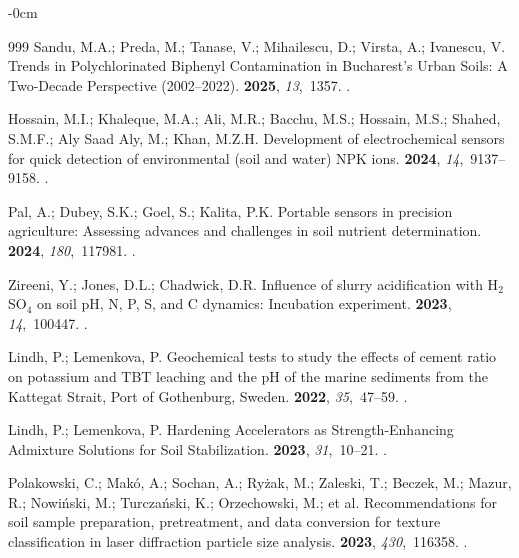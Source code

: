 \documentclass[environremediat,article,accept,pdftex,oneauthor]{Definitions/mdpi}
\begin{document}
\begin{adjustwidth}{-\extralength}{0cm}
\begin{thebibliography}{999}
Sandu, M.A.; Preda, M.; Tanase, V.;  Mihailescu, D.; Virsta, A.; Ivanescu, V.
\newblock Trends in Polychlorinated Biphenyl Contamination in Bucharest's Urban
  Soils: A Two-Decade Perspective (2002--2022).
 {\bf 2025}, {\em 13},~1357.
.

Hossain, M.I.; Khaleque, M.A.; Ali, M.R.; Bacchu, M.S.; Hossain, M.S.; Shahed, S.M.F.; Aly Saad Aly, M.; Khan, M.Z.H.
\newblock Development of electrochemical sensors for quick detection of
  environmental (soil and water) NPK ions.
 {\bf 2024}, {\em 14},~9137--9158.
.

Pal, A.; Dubey, S.K.; Goel, S.; Kalita, P.K.
\newblock Portable sensors in precision agriculture: Assessing advances and
  challenges in soil nutrient determination.
 {\bf 2024}, {\em
  180},~117981.
.

Zireeni, Y.; Jones, D.L.; Chadwick, D.R.
\newblock Influence of slurry acidification with H$_2$SO$_4$ on soil pH, N, P,
  S, and C dynamics: Incubation experiment.
 {\bf 2023}, {\em 14},~100447.
.

Lindh, P.; Lemenkova, P.
\newblock Geochemical tests to study the effects of cement ratio on potassium
  and TBT leaching and the pH of the marine sediments from the Kattegat Strait,
  Port of Gothenburg, Sweden.
 {\bf 2022}, {\em 35},~47--59.
.

Lindh, P.; Lemenkova, P.
\newblock Hardening Accelerators as Strength-Enhancing Admixture Solutions for
  Soil Stabilization.
 {\bf 2023}, {\em
  31},~10--21.
.

Polakowski, C.; Mak{\'o}, A.; Sochan, A.; Ry{\.z}ak, M.; Zaleski, T.; Beczek, M.; Mazur, R.; Nowi{\'n}ski, M.; Turcza{\'n}ski, K.; Orzechowski, M.; et al.
\newblock Recommendations for soil sample preparation, pretreatment, and data
  conversion for texture classification in laser diffraction particle size
  analysis.
 {\bf 2023}, {\em 430},~116358.
.


\end{thebibliography}
\end{adjustwidth}
\end{document}
